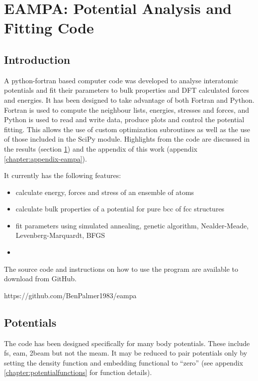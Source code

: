 
\section[EAMPA]{EAMPA: Potential Analysis and Fitting Code}
\label{code:eampa}

\subsection{Introduction}


A python-fortran based computer code was developed to analyse interatomic potentials and fit their parameters to bulk properties and DFT calculated forces and energies.  It has been designed to take advantage of both Fortran and Python.  Fortran is used to compute the neighbour lists, energies, stresses and forces, and Python is used to read and write data, produce plots and control the potential fitting.  This allows the use of custom optimization subroutines as well as the use of those included in the SciPy module.  Highlights from the code are discussed in the results (section \ref{code:eampa}) and the appendix of this work (appendix \ref{chapter:appendix-eampa}).

It currently has the following features:

\begin{itemize}
\item calculate energy, forces and stress of an ensemble of atoms 
\item calculate bulk properties of a potential for pure \acrshort{bcc} of \acrshort{fcc} structures
\item fit parameters using simulated annealing, genetic algorithm, Nealder-Meade, Levenberg-Marquardt, BFGS
\item  
\end{itemize}

The source code and instructions on how to use the program are available to download from GitHub.

https://github.com/BenPalmer1983/eampa





\subsection{Potentials}

The code has been designed specifically for many body potentials.  These include \acrlong{fs},  \acrlong{eam}, \acrlong{2beam} but not the \acrlong{meam}.  It may be reduced to pair potentials only by setting the density function and embedding functional to \enquote{zero} (see appendix \ref{chapter:potentialfunctions} for function details).  

